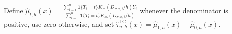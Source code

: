 Define \(\widehat{\mu}_{t,h}(x)=\frac{\sum_{i=1}^n\mathbf{1}\{T_i=t\}K_\triangle(D_{P,x,i}/h)Y_i}{\sum_{i=1}^n\mathbf{1}\{T_i=t\}K_\triangle(D_{P,x,i}/h)}\) whenever the denominator is positive, use zero otherwise, and set \(\widehat{\tau}^{\mathrm{LC}}_{n,h}(x)=\widehat{\mu}_{1,h}(x)-\widehat{\mu}_{0,h}(x)\).